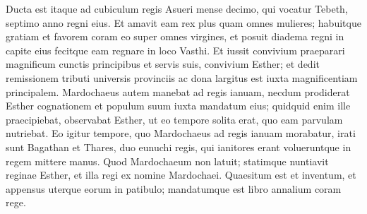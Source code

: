 \begin{biblechapter}
\verse Ducta est itaque ad cubiculum regis Asueri mense decimo, qui vocatur Tebeth, septimo anno regni eius. 
\verse Et amavit eam rex plus quam omnes mulieres; habuitque gratiam et favorem coram eo super omnes virgines, et posuit diadema regni in capite eius fecitque eam regnare in loco Vasthi. 
\verse Et iussit convivium praeparari magnificum cunctis principibus et servis suis, convivium Esther; et dedit remissionem tributi universis provinciis ac dona largitus est iuxta magnificentiam principalem. 
\verse Mardochaeus autem manebat ad regis ianuam, 
\verse necdum prodiderat Esther cognationem et populum suum iuxta mandatum eius; quidquid enim ille praecipiebat, observabat Esther, ut eo tempore solita erat, quo eam parvulam nutriebat. 
\verse Eo igitur tempore, quo Mardochaeus ad regis ianuam morabatur, irati sunt Bagathan et Thares, duo eunuchi regis, qui ianitores erant volueruntque in regem mittere manus. 
\verse Quod Mardochaeum non latuit; statimque nuntiavit reginae Esther, et illa regi ex nomine Mardochaei. 
\verse Quaesitum est et inventum, et appensus uterque eorum in patibulo; mandatumque est libro annalium coram rege. 
\end{biblechapter}

